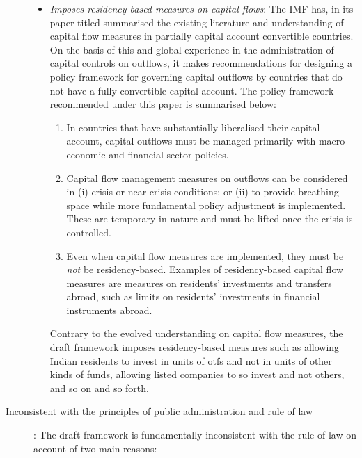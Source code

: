 \documentclass[11pt,a4paper]{article} \usepackage[parfill]{parskip}
\begin{document}
\begin{description}
\begin{itemize}
  \item \textsl{Imposes residency based measures on capital flows}:
    The IMF has, in its paper titled 
    summarised the existing literature and understanding of capital
    flow measures in partially capital account convertible
    countries. On the basis of this and global experience in the
    administration of capital controls on outflows, it makes
    recommendations for designing a policy framework for governing
    capital outflows by countries that do not have a fully convertible
    capital account. The policy framework recommended under this paper
    is summarised below:

    \begin{enumerate}
    \item In countries that have substantially liberalised their
      capital account, capital outflows must be managed primarily with
      macro-economic and financial sector policies.
    \item Capital flow management measures on outflows can be
      considered in (i) crisis or near crisis conditions; or (ii) to
      provide breathing space while more fundamental policy adjustment
      is implemented. These are temporary in nature and must be lifted
      once the crisis is controlled.
    \item Even when capital flow measures are implemented, they must
      be \textsl{not} be residency-based. Examples of residency-based
      capital flow measures are measures on residents' investments and
      transfers abroad, such as limits on residents' investments in
      financial instruments abroad.
    \end{enumerate}

    Contrary to the evolved understanding on capital flow measures,
    the draft framework imposes residency-based measures such as
    allowing Indian residents to invest in units of \glspl{otf} and
    not in units of other kinds of funds, allowing listed companies to
    so invest and not others, and so on and so forth.

  \end{itemize}

\item[Inconsistent with the principles of public administration and
  rule of law]: The draft framework is fundamentally inconsistent with
  the rule of law on account of two main reasons:

  \begin{itemize}


\end{itemize}
\end{description}
\end{document}
